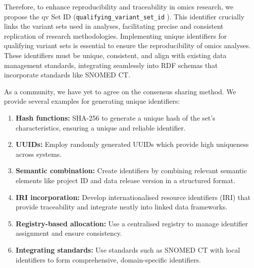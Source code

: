Therefore, to enhance reproducibility and traceability in omics research, we propose the \ac{qv} Set ID (\texttt{qualifying\_variant\_set\_id} ). This identifier crucially links the variant sets used in analyses, facilitating precise and consistent replication of research methodologies.
Implementing unique identifiers for qualifying variant sets is essential to ensure the reproducibility of omics analyses. These identifiers must be unique, consistent, and align with existing data management standards, integrating seamlessly into RDF schemas that incorporate standards like SNOMED CT.

As a community, we have yet to agree on the consensus sharing method. 
We provide several examples for generating unique identifiers:

\begin{enumerate}
    \item \textbf{Hash functions:} SHA-256 to generate a unique hash of the set's characteristics, ensuring a unique and reliable identifier.
    \item \textbf{UUIDs:} Employ randomly generated UUIDs which provide high uniqueness across systems.
    \item \textbf{Semantic combination:} Create identifiers by combining relevant semantic elements like project ID and data release version in a structured format.
    \item \textbf{IRI incorporation:} Develop internationalised resource identifiers (IRI) that provide traceability and integrate neatly into linked data frameworks.
    \item \textbf{Registry-based allocation:} Use a centralised registry to manage identifier assignment and ensure consistency.
    \item \textbf{Integrating standards:} Use standards such as SNOMED CT with local identifiers to form comprehensive, domain-specific identifiers.
\end{enumerate}

